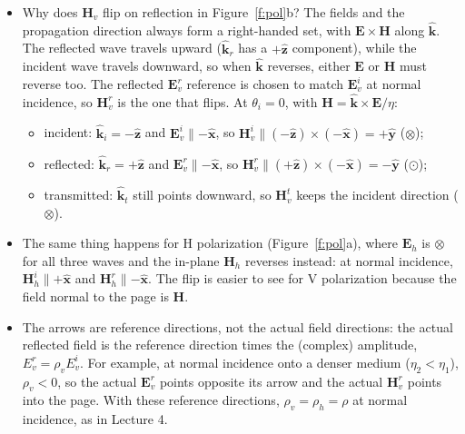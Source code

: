 \documentclass[11pt, oneside]{article}
\begin{document}
\begin{itemize}
	\item Why does $\mathbf{H}_v$ flip on reflection in Figure~\ref{f:pol}b? The fields and the propagation direction always form a right-handed set, with $\mathbf{E}\times\mathbf{H}$ along $\hat{\mathbf{k}}$. The reflected wave travels upward ($\hat{\mathbf{k}}_r$ has a $+\hat{\mathbf{z}}$ component), while the incident wave travels downward, so when $\hat{\mathbf{k}}$ reverses, either $\mathbf{E}$ or $\mathbf{H}$ must reverse too. The reflected $\mathbf{E}_v^r$ reference is chosen to match $\mathbf{E}_v^i$ at normal incidence, so $\mathbf{H}_v^r$ is the one that flips. At $\theta_i = 0$, with $\mathbf{H} = \hat{\mathbf{k}}\times\mathbf{E}/\eta$:
	\begin{itemize}
		\item incident: $\hat{\mathbf{k}}_i = -\hat{\mathbf{z}}$ and $\mathbf{E}_v^i \parallel -\hat{\mathbf{x}}$, so $\mathbf{H}_v^i \parallel (-\hat{\mathbf{z}})\times(-\hat{\mathbf{x}}) = +\hat{\mathbf{y}}$ ($\otimes$);
		\item reflected: $\hat{\mathbf{k}}_r = +\hat{\mathbf{z}}$ and $\mathbf{E}_v^r \parallel -\hat{\mathbf{x}}$, so $\mathbf{H}_v^r \parallel (+\hat{\mathbf{z}})\times(-\hat{\mathbf{x}}) = -\hat{\mathbf{y}}$ ($\odot$);
		\item transmitted: $\hat{\mathbf{k}}_t$ still points downward, so $\mathbf{H}_v^t$ keeps the incident direction ($\otimes$).
	\end{itemize}
	\item The same thing happens for H polarization (Figure~\ref{f:pol}a), where $\mathbf{E}_h$ is $\otimes$ for all three waves and the in-plane $\mathbf{H}_h$ reverses instead: at normal incidence, $\mathbf{H}_h^i \parallel +\hat{\mathbf{x}}$ and $\mathbf{H}_h^r \parallel -\hat{\mathbf{x}}$. The flip is easier to see for V polarization because the field normal to the page is $\mathbf{H}$.
	\item The arrows are reference directions, not the actual field directions: the actual reflected field is the reference direction times the (complex) amplitude, $E_v^r = \rho_vE_v^i$. For example, at normal incidence onto a denser medium ($\eta_2 < \eta_1$), $\rho_v < 0$, so the actual $\mathbf{E}_v^r$ points opposite its arrow and the actual $\mathbf{H}_v^r$ points into the page. With these reference directions, $\rho_v = \rho_h = \rho$ at normal incidence, as in Lecture 4.
\end{itemize}
\end{document}
